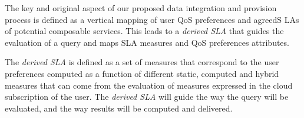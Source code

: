 
The key and original aspect of  our proposed data integration and provision process is  defined as a vertical mapping of user QoS preferences and agreedS LAs of potential composable services. This  leads to a {\em derived SLA} that guides the evaluation of a query and maps SLA measures and QoS preferences attributes.  




The {\em derived SLA} is defined as a set of measures that correspond to the user preferences computed as a function of different static, computed and hybrid measures that can come from the evaluation of measures expressed in the cloud subscription of the user. 
The {\em derived SLA}  will guide the way the query will be evaluated, and the way results will be computed and delivered.


